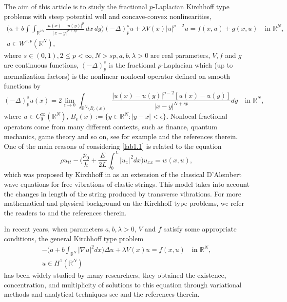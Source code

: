 \documentclass[reqno]{amsart}
\begin{document}
The aim of this article is to study the fractional $p$-Laplacian Kirchhoff type 
problems with steep potential well and concave-convex nonlinearities,
\begin{equation}\label{lab1.1}
\begin{gathered}
\Big(a+b\int\int_{\mathbb{R}^{2N}}\frac{|u(x)-u(y)|^p}{|x-y|^{N+sp}}\,dx\,dy\Big)
(-\Delta)_p^su+\lambda V(x)|u|^{p-2}u=f(x,u)+g(x,u)\quad \text{in }\mathbb{R}^N, \\
u\in W^{s,p}(\mathbb{R}^N),
\end{gathered}
\end{equation}
where $s\in(0,1), 2\leq p<\infty, N>sp, a, b, \lambda>0$ are real parameters, $V, f$ 
and $g$ are continuous functions, $(-\Delta)^s_p$ is the fractional $p$-Laplacian 
which (up to normalization factors) is the nonlinear nonlocal operator defined on 
smooth functions by
$$
(-\Delta)^s_pu(x)=2\lim_{\epsilon\to 0}\int_{\mathbb{R}^N\setminus 
B_\epsilon(x)}\frac{|u(x)-u(y)|^{p-2}[u(x)-u(y)]}{|x-y|^{N+sp}}dy\quad
 \text{in }\mathbb{R}^N,
$$
where $u\in C_0^\infty(\mathbb{R}^N)$, 
$B_\epsilon(x):=\{y\in\mathbb{R}^N:|y-x|<\epsilon\}$. Nonlocal fractional operators 
come from many different contexts, such as finance, quantum mechanics, 
game theory and so on, see for example \cite{r5, r14, r15,r18} and the references 
therein. One of the main reasons of considering \eqref{lab1.1} is related to the 
equation
$$
 \rho u_{tt}-\Big(\frac{p_0}{h}+\frac{E}{2L}\int^L_0 |u_x|^2dx \Big)u_{xx}=w(x,u),
$$
which was proposed by Kirchhoff in \cite{r13} as an extension of the classical 
D'Alembert wave equations for free vibrations of elastic strings. 
This model takes into account the changes in length of the string produced by 
transverse vibrations. For more mathematical and physical background on the 
Kirchhoff type problems, we refer the readers to \cite{r1, r4} and the references 
therein.

In recent years, when parameters $a, b, \lambda>0$, $V$ and $f$ satisfy some 
appropriate conditions, the general Kirchhoff type problem
\begin{gather*}
-\Big(a+b\int_{\mathbb{R}^N}|\nabla u|^2dx\Big)\Delta u+\lambda V(x)u= f(x,u)\quad
 \text{in } \mathbb{R}^N, \\
u\in H^1(\mathbb{R}^N)
\end{gather*}
has been widely studied by many researchers, they obtained the existence, 
concentration, and multiplicity of solutions to this equation through variational 
methods and analytical techniques see \cite{r10, r16, r23, r27, r30, r34} and the 
references therein.
\end{document}

